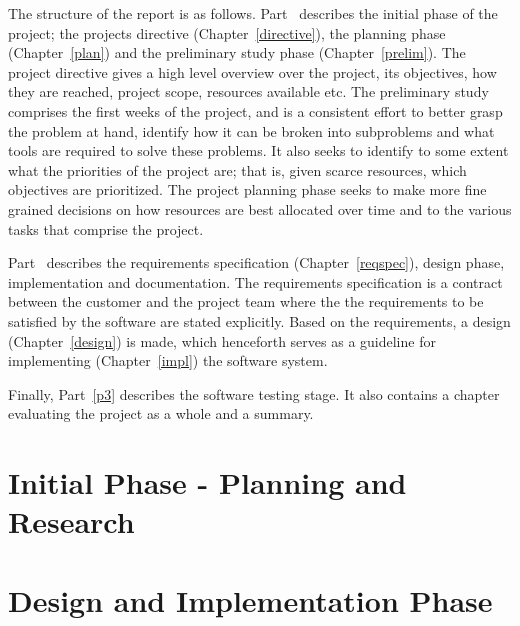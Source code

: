 \documentclass[11pt]{book}
\begin{document}
The structure of the report is as follows. Part~\ref{p1} describes the initial phase of the project; the projects directive (Chapter~\ref{directive}), the planning phase (Chapter~\ref{plan}) and the preliminary study phase (Chapter~\ref{prelim}). The project directive gives a high level overview over the project, its objectives, how they are reached, project scope, resources available etc. The preliminary study comprises the first weeks of the project, and is a consistent effort to better grasp the problem at hand, identify how it can be broken into subproblems and what tools are required to solve these problems. It also seeks to identify to some extent what the priorities of the project are; that is, given scarce resources, which objectives are prioritized. The project planning phase seeks to make more fine grained decisions on how resources are best allocated over time and to the various tasks that comprise the project.

Part~\ref{p2} describes the requirements specification (Chapter~\ref{reqspec}), design phase, implementation and documentation. The requirements specification is a contract between the customer and the project team where the the requirements to be satisfied by the software are stated explicitly. Based on the requirements, a design (Chapter~\ref{design}) is made, which henceforth serves as a guideline for implementing (Chapter~\ref{impl}) the software system.

Finally, Part~\ref{p3} describes the software testing stage. It also
contains a chapter evaluating the project as a whole and a summary.

\part{Initial Phase - Planning and Research}\label{p1}
\addtocounter{chapter}{1}
\setcounter{section}{0}


\setcounter{section}{0}
\addtocounter{chapter}{1}


\setcounter{section}{0}
\addtocounter{chapter}{1}


\part{Design and Implementation Phase}\label{p2}
\setcounter{section}{0}
\addtocounter{chapter}{1}


\setcounter{section}{0}
\addtocounter{chapter}{1}

\end{document}

